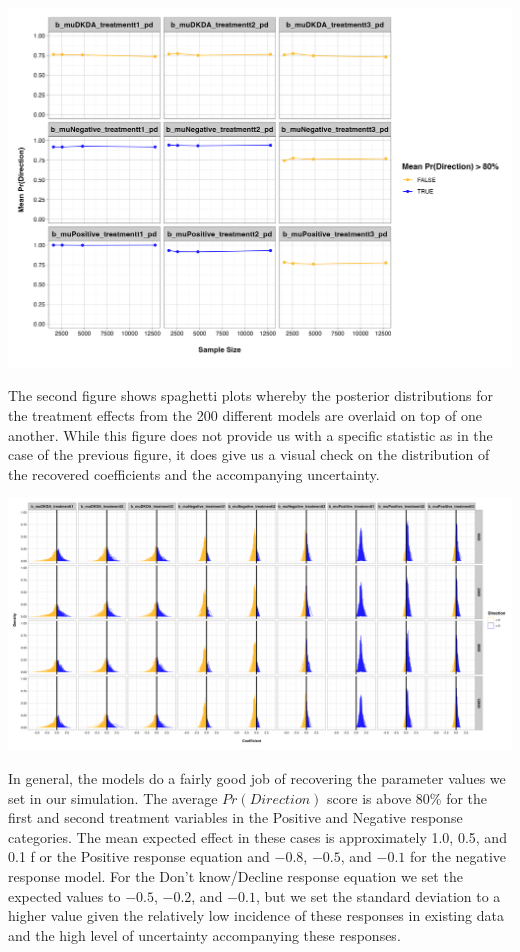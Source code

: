 \documentclass[
  10,
  letterpaper,
  DIV=11,
  numbers=noendperiod]{scrartcl}
\begin{document}
\includegraphics{../Figures/fig-sim-threshold.jpg}

The second figure shows spaghetti plots whereby the posterior
distributions for the treatment effects from the 200 different models
are overlaid on top of one another. While this figure does not provide
us with a specific statistic as in the case of the previous figure, it
does give us a visual check on the distribution of the recovered
coefficients and the accompanying uncertainty.

\includegraphics{../Figures/fig-sim-spaghetti.jpg}

In general, the models do a fairly good job of recovering the parameter
values we set in our simulation. The average \(Pr(Direction)\) score is
above 80\% for the first and second treatment variables in the Positive
and Negative response categories. The mean expected effect in these
cases is approximately 1.0, 0.5, and 0.1 f or the Positive response
equation and \(-0.8\), \(-0.5\), and \(-0.1\) for the negative response
model. For the Don't know/Decline response equation we set the expected
values to \(-0.5\), \(-0.2\), and \(-0.1\), but we set the standard
deviation to a higher value given the relatively low incidence of these
responses in existing data and the high level of uncertainty
accompanying these responses.
\end{document}
